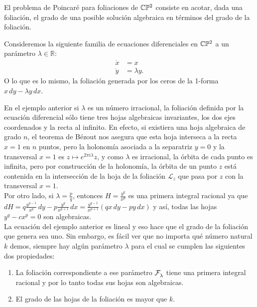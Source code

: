 El problema de Poincaré para foliaciones de $\mathbb{C}\mathbb{P}^2$ consiste en acotar, dada una foliación, el grado de una posible solución algebraica en términos del grado de la foliación.
 
\begin{Ejemplo}
\label{Ej:Intro}
Consideremos la siguiente familia de ecuaciones diferenciales en $\mathbb{C}\mathbb{P}^2$ a un parámetro $\lambda\in\mathbb{R}$:
\begin{align*}
\dot{x} & = x \\
\dot{y} & = \lambda y.
\end{align*}
O lo que es lo mismo, la foliación generada por los ceros de la 1-forma $x\,dy - \lambda y\,dx$.
\end{Ejemplo}

\noindent En el ejemplo anterior si $\lambda$ es un número irracional, la foliación definida por la ecuación diferencial sólo tiene tres hojas algebraicas invariantes, los dos ejes coordenados y la recta al infinito. En efecto, si existiera una hoja algebraica de grado $n$, el teorema de Bézout nos asegura que esta hoja interseca a la recta $x=1$ en $n$ puntos, pero la holonomía asociada a la separatriz $y=0$ y la transversal $x=1$ es $z\mapsto e^{2\pi i\lambda}z$,  y como $\lambda$ es irracional, la órbita de cada punto es infinita, pero por construcción de la holonomía, la órbita de un punto $z$ está contenida en la intersección de la hoja de la foliación $\mathcal{L}_z$ que pasa por $z$ con la transversal $x=1$. 
\\
Por otro lado, si $\lambda = \tfrac{p}{q}$, entonces $H = \tfrac{y^q}{x^p}$ es una primera integral racional ya que $dH = q\tfrac{y^{q-1}}{x^p}\,dy - p\tfrac{y^q}{x^{p+1}}\,dx = \tfrac{y^{q-1}}{x^{p+1}}(qx\,dy -py\,dx)$ y así, todas las hojas $y^q-cx^p=0$ son algebraicas.
\\

La ecuación del ejemplo anterior es lineal y eso hace que el grado de la foliación que genera sea uno. Sin embargo, es fácil ver que no importa qué número natural $k$ demos, siempre hay algún parámetro $\lambda$ para el cual se cumplen las siguientes dos propiedades:

\begin{enumerate}
\item La foliación correspondiente a ese parámetro $\mathcal{F}^{\ }_{\lambda}$ tiene una primera integral racional y por lo tanto todas sus hojas son algebraicas.

\item El grado de las hojas de la foliación es mayor que $k$.
\end{enumerate}  

